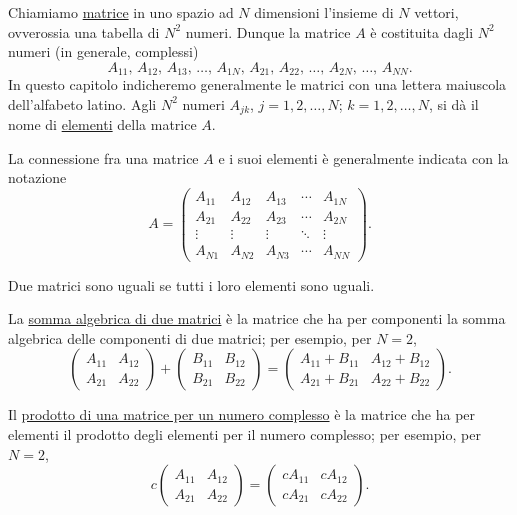 \documentclass[11pt, a4paper]{book}
\numberwithin{equation}{section}
\begin{document}
Chiamiamo \underline{matrice} in uno spazio ad $N$ dimensioni l'insieme di $N$ vettori, ovverossia una tabella di $N^2$ numeri. Dunque la matrice $A$ è costituita dagli $N^2$ numeri (in generale, complessi)
\[
    A_{11},\, A_{12},\, A_{13},\, \ldots,\, A_{1N},\, A_{21},\, A_{22},\, \ldots,\, A_{2N},\, \ldots,\, A_{NN}.
\]
In questo capitolo indicheremo generalmente le matrici con una lettera maiuscola dell'alfabeto latino. Agli $N^2$ numeri $A_{jk}$, $j = 1,2,\ldots,N$; $k = 1,2,\ldots,N$, si dà il nome di \underline{elementi} della matrice $A$.

La connessione fra una matrice $A$ e i suoi elementi è generalmente indicata con la notazione
\[
A =
\begin{pmatrix}
A_{11} & A_{12} & A_{13} & \cdots & A_{1N} \\
A_{21} & A_{22} & A_{23} & \cdots & A_{2N} \\
\vdots & \vdots & \vdots & \ddots & \vdots \\
A_{N1} & A_{N2} & A_{N3} & \cdots & A_{NN}
\end{pmatrix}.
\]

Due matrici sono uguali se tutti i loro elementi sono uguali.

La \underline{somma algebrica di due matrici} è la matrice che ha per componenti la somma algebrica delle componenti di due matrici; per esempio, per $N = 2$,
\[
\begin{pmatrix} A_{11} & A_{12} \\ A_{21} & A_{22} \end{pmatrix}
+
\begin{pmatrix} B_{11} & B_{12} \\ B_{21} & B_{22} \end{pmatrix}
=
\begin{pmatrix} A_{11} + B_{11} & A_{12} + B_{12} \\ A_{21} + B_{21} & A_{22} + B_{22} \end{pmatrix}.
\]

Il \underline{prodotto di una matrice per un numero complesso} è la matrice che ha per elementi il prodotto degli elementi per il numero complesso; per esempio, per $N = 2$,
\[
c
\begin{pmatrix} A_{11} & A_{12} \\ A_{21} & A_{22} \end{pmatrix}
=
\begin{pmatrix} cA_{11} & cA_{12} \\ cA_{21} & cA_{22} \end{pmatrix}.
\]
\end{document}
